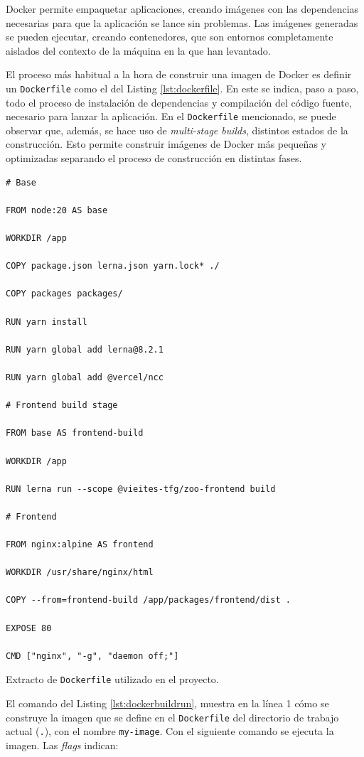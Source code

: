 Docker permite empaquetar aplicaciones, creando imágenes con las dependencias necesarias para que la aplicación se lance sin problemas. Las imágenes generadas se pueden ejecutar, creando contenedores, que son entornos completamente aislados del contexto de la máquina en la que han levantado.

El proceso más habitual a la hora de construir una imagen de Docker es definir un \texttt{Dockerfile} como el del Listing \ref{lst:dockerfile}. En este se indica, paso a paso, todo el proceso de instalación de dependencias y compilación del código fuente, necesario para lanzar la aplicación. En el \texttt{Dockerfile} mencionado, se puede observar que, además, se hace uso de \textit{multi-stage builds}, distintos estados de la construcción. Esto permite construir imágenes de Docker más pequeñas y optimizadas separando el proceso de construcción en distintas fases.

\begin{longlisting}
  \begin{verbatim}
# Base

FROM node:20 AS base

WORKDIR /app

COPY package.json lerna.json yarn.lock* ./

COPY packages packages/

RUN yarn install

RUN yarn global add lerna@8.2.1

RUN yarn global add @vercel/ncc

# Frontend build stage

FROM base AS frontend-build

WORKDIR /app

RUN lerna run --scope @vieites-tfg/zoo-frontend build 

# Frontend

FROM nginx:alpine AS frontend

WORKDIR /usr/share/nginx/html

COPY --from=frontend-build /app/packages/frontend/dist .

EXPOSE 80

CMD ["nginx", "-g", "daemon off;"]
\end{verbatim}
\caption{Extracto de \texttt{Dockerfile} utilizado en el proyecto.}
\label{lst:dockerfile}
\end{longlisting}


El comando del Listing \ref{lst:dockerbuildrun}, muestra en la línea 1 cómo se construye la imagen que se define en el \texttt{Dockerfile} del directorio de trabajo actual (\texttt{.}), con el nombre \texttt{my-image}. Con el siguiente comando se ejecuta la imagen. Las \textit{flags} indican:

